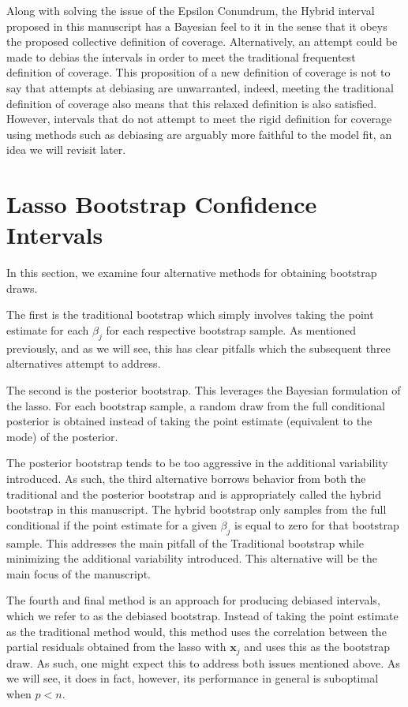 Along with solving the issue of the Epsilon Conundrum, the Hybrid interval proposed in this manuscript has a Bayesian feel to it in the sense that it obeys the proposed collective definition of coverage. Alternatively, an attempt could be made to debias the intervals in order to meet the traditional frequentest definition of coverage. This proposition of a new definition of coverage is not to say that attempts at debiasing are unwarranted, indeed, meeting the traditional definition of coverage also means that this relaxed definition is also satisfied. However, intervals that do not attempt to meet the rigid definition for coverage using methods such as debiasing are arguably more faithful to the model fit, an idea we will revisit later. 


\section{Lasso Bootstrap Confidence Intervals}

In this section, we examine four alternative methods for obtaining bootstrap draws.

The first is the traditional bootstrap which simply involves taking the point estimate for each $\beta_j$ for each respective bootstrap sample. As mentioned previously, and as we will see, this has clear pitfalls which the subsequent three alternatives attempt to address.

The second is the posterior bootstrap. This leverages the Bayesian formulation of the lasso. For each bootstrap sample, a random draw from the full conditional posterior is obtained instead of taking the point estimate (equivalent to the mode) of the posterior.

The posterior bootstrap tends to be too aggressive in the additional variability introduced. As such, the third alternative borrows behavior from both the traditional and the posterior bootstrap and is appropriately called the hybrid bootstrap in this manuscript. The hybrid bootstrap only samples from the full conditional if the point estimate for a given $\beta_j$ is equal to zero for that bootstrap sample. This addresses the main pitfall of the Traditional bootstrap while minimizing the additional variability introduced. This alternative will be the main focus of the manuscript.

The fourth and final method is an approach for producing debiased intervals, which we refer to as the debiased bootstrap. Instead of taking the point estimate as the traditional method would, this method uses the correlation between the partial residuals obtained from the lasso with $\boldsymbol{x}_j$ and uses this as the bootstrap draw. As such, one might expect this to address both issues mentioned above. As we will see, it does in fact, however, its performance in general is suboptimal when $p < n$.

